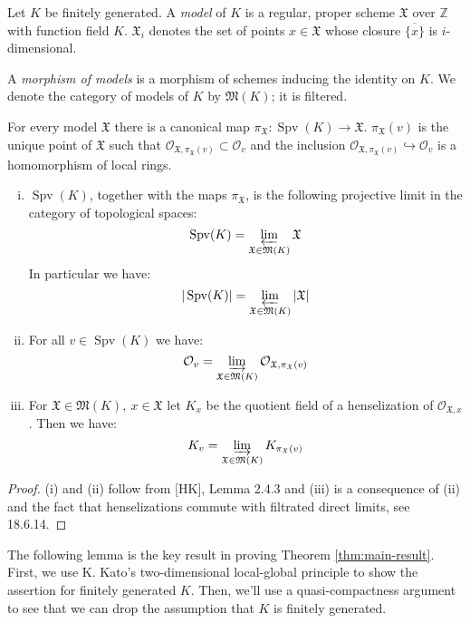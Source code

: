 \begin{definition}
Let $K$ be finitely generated. A \textit{model} of $K$ is a regular, proper scheme $\mathfrak{X}$ over $\mathbb{Z}$ with function field $K$. $\mathfrak{X}_i$ denotes the set of points $x\in\mathfrak{X}$ whose closure $\overline{\{x\}}$ is $i$-dimensional.

A \textit{morphism of models} is a morphism of schemes inducing the identity on $K$. We denote the category of models of $K$ by $\mathfrak{M}(K)$; it is filtered. 

For every model $\mathfrak{X}$ there is a canonical map $\pi_\mathfrak{X}:\operatorname{Spv}(K)\to\mathfrak{X}$. $\pi_\mathfrak{X}(v)$  is the unique point of $\mathfrak{X}$ such that $\mathcal{O}_{\mathfrak{X}, \pi_\mathfrak{X}(v)}\subset\mathcal{O}_v$ and the inclusion $\mathcal{O}_{\mathfrak{X}, \pi_\mathfrak{X}(v)}\hookrightarrow \mathcal{O}_v$ is a homomorphism of local rings.
\end{definition}

\begin{lemma}\label{2.3}
\begin{enumerate}[(i)]
\item $\operatorname{Spv}(K)$, together with the maps $\pi_{\mathfrak{X}}$, is the following projective limit in the category of topological spaces: 
\[\operatorname{Spv}(K) =\varprojlim_{\mathfrak{X}\in\mathfrak{M}(K)}\mathfrak{X}\]
In particular we have:
\[ |\operatorname{Spv}(K)| =\varprojlim_{\mathfrak{X}\in\mathfrak{M}(K)}|\mathfrak{X}| \]
\item For all $v\in\operatorname{Spv}(K)$ we have:
\[ \mathcal{O}_v = \varinjlim_{\mathfrak{X}\in\mathfrak{M}(K)}\mathcal{O}_{\mathfrak{X},\pi_\mathfrak{X}(v)} \]
\item For $\mathfrak{X}\in\mathfrak{M}(K),\ x\in\mathfrak{X}$ let $K_x$ be the quotient field of a henselization of $\mathcal{O}_{\mathfrak{X},x}$. Then we have:
\[ K_v=\varinjlim_{\mathfrak{X}\in\mathfrak{M}(K)}K_{\pi_\mathfrak{X}(v)} \]
\end{enumerate}
\end{lemma}

\begin{proof}
(i) and (ii) follow from [HK], Lemma 2.4.3 and (iii) is a consequence of (ii) and the fact that henselizations commute with filtrated direct limits, see \cite{EGA4} 18.6.14.
\end{proof}

The following lemma is the key result in proving Theorem \ref{thm:main-result}. First, we use K. Kato's two-dimensional local-global principle to show the assertion for finitely generated $K$. Then, we'll use a quasi-compactness argument to see that we can drop the assumption that $K$ is finitely generated.

